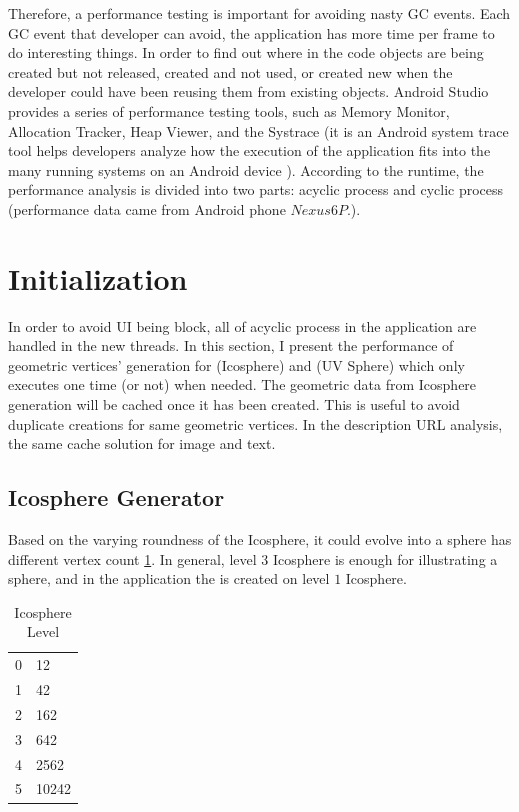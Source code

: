Therefore, a performance testing is important for avoiding nasty GC events. Each GC event that developer can avoid, the application has more time per frame to do interesting things. In order to find out where in the code objects are being created but not released, created and not used, or created new when the developer could have been reusing them from existing objects. Android Studio provides a series of performance testing tools, such as Memory Monitor, Allocation Tracker, Heap Viewer, and the Systrace (it is an Android system trace tool helps developers analyze how the execution of the application fits into the many running systems on an Android device \cite{google.systrace.2016}). According to the runtime, the performance analysis is divided into two parts: acyclic process and cyclic process (performance data came from Android phone $Nexus 6P$.).

\section{Initialization}

In order to avoid UI being block, all of acyclic process in the application are handled in the new threads. In this section, I present the performance of geometric vertices' generation for  (Icosphere) and  (UV Sphere) which only executes one time (or not) when needed. The geometric data from Icosphere generation will be cached once it has been created. This is useful to avoid duplicate creations for same geometric vertices. In the  description URL analysis, the same cache solution for image and text.

\subsection{Icosphere Generator}

Based on the varying roundness of the Icosphere, it could evolve into a sphere has different vertex count \ref{tab:icosphere-level}. In general, level $3$ Icosphere is enough for illustrating a sphere, and in the application the  is created on level $1$ Icosphere.

\begin{table}[H]
	\caption{Icosphere Level}
	\label{tab:icosphere-level}
	\centering
	\begin{tabular}{l l}
		\toprule
		\tabhead{Recursion Level} & \tabhead{Vertex Count}\\
		\midrule
		0 & 12\\
		1 & 42\\
		2 & 162\\
		3 & 642\\
		4 & 2562\\
		5 & 10242\\
		\bottomrule
	\end{tabular}
\end{table}

